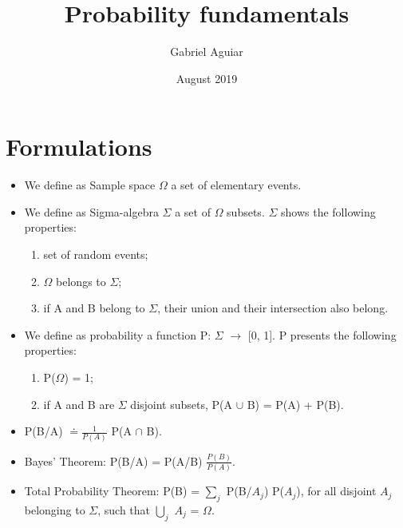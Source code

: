 \documentclass{article}
\title{Probability fundamentals}
\author{Gabriel Aguiar}
\date{August 2019}
\begin{document}
\maketitle

\section{Formulations}

\begin{itemize}
    
\item We define as Sample space $\Omega$ a set of elementary events.
        
\item We define as Sigma-algebra $\Sigma$ a set of $\Omega$ subsets. $\Sigma$ shows the following properties:
\begin{enumerate}
    \item set of random events;
    \item $\Omega$ belongs to $\Sigma$;
    \item if A and B belong to $\Sigma$, their union and their intersection also belong.
\end{enumerate}

\item We define as probability a function P: $\Sigma$ $\rightarrow$ [0, 1]. P presents the following properties: 
\begin{enumerate}
\item P($\Omega$) = 1; 
\item if A and B are $\Sigma$ disjoint subsets, P(A $\cup$ B) = P(A) + P(B).
\end{enumerate}

\item P(B/A) $\doteq \frac{1}{P(A)}$ P(A $\cap$ B).

\item Bayes' Theorem: P(B/A) = P(A/B) $\frac{P(B)}{P(A)}$.

\item Total Probability Theorem: P(B) = $\sum\limits_{j}$ P(B/$A_{j}$) P($A_{j}$), for all disjoint $A_{j}$ belonging to $\Sigma$, such that $\bigcup\limits_{j}$ $A_{j}$ = $\Omega$.



        
\end{itemize}
\end{document}
